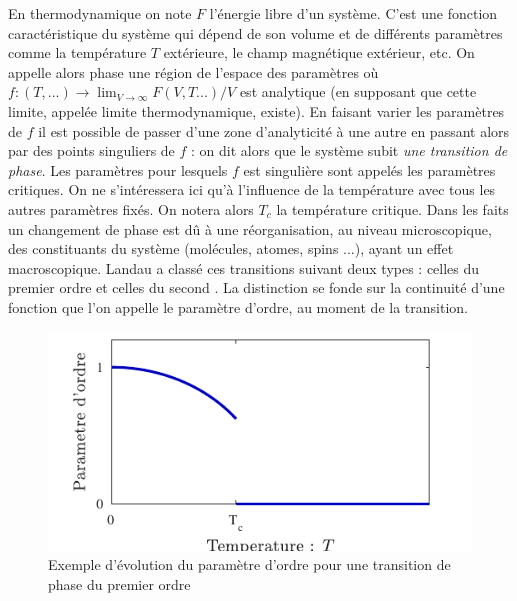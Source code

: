 \documentclass[10.5pt]{article}
\begin{document}
\begin{multicols*}{2}
En thermodynamique on note $F$ l'énergie libre d'un système. C'est une fonction caractéristique du système qui dépend de son volume et de différents paramètres comme la température $T$ extérieure, le champ magnétique extérieur, etc. On appelle alors phase une région de l'espace des paramètres où $f : (T, ...) \to \lim_{V \to \infty} F(V,T...)/V$ est analytique (en supposant que cette limite, appelée limite thermodynamique, existe). En faisant varier les paramètres de $f$ il est possible de passer d'une zone d'analyticité à une autre en passant alors par des points singuliers de $f$ : on dit alors que le système subit \textit{une transition de phase}. Les paramètres pour lesquels $f$ est singulière sont appelés les paramètres critiques. On ne s'intéressera ici qu'à l'influence de la température avec tous les autres paramètres fixés. On notera alors $T_c$ la température critique. Dans les faits un changement de phase est dû à une réorganisation, au niveau microscopique, des constituants  du système (molécules, atomes, spins ...), ayant un effet macroscopique. Landau a classé ces transitions suivant deux types : celles du premier ordre et celles du second \cite{toledano1987landau}. La distinction se fonde sur la continuité d'une fonction que l'on appelle le paramètre d'ordre, au moment de la transition. 
 \begin{figure}[H]
\begin{center}
\includegraphics[width=0.95\columnwidth]{aimantation2.pdf}
\caption{Exemple d'évolution du paramètre d'ordre pour une transition de phase du premier ordre}
\label{fig:aimantation2}
\end{center}
\end{figure}
\vspace*{-11pt}

\end{multicols*}
\end{document}
